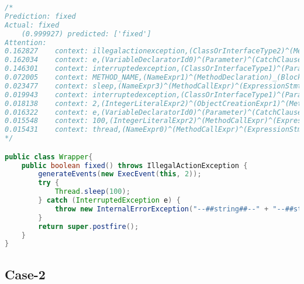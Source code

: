 \begin{lstlisting}[basicstyle=\tiny,caption={Case-1 fixed}, label={},language=Java,breaklines=true,
  postbreak=\mbox{\textcolor{red}{$\hookrightarrow$}\space}]
/*
Prediction:	fixed
Actual:	fixed
	(0.999927) predicted: ['fixed']
Attention:
0.162827	context: illegalactionexception,(ClassOrInterfaceType2)^(MethodDeclaration)_(BlockStmt)_(TryStmt)_(CatchClause)_(BlockStmt)_(ThrowStmt)_(ObjectCreationExpr)_(ClassOrInterfaceType0),internalerrorexception
0.162034	context: e,(VariableDeclaratorId0)^(Parameter)^(CatchClause)_(BlockStmt)_(ThrowStmt)_(ObjectCreationExpr)_(ClassOrInterfaceType0),internalerrorexception
0.146301	context: interruptedexception,(ClassOrInterfaceType1)^(Parameter)^(CatchClause)_(BlockStmt)_(ThrowStmt)_(ObjectCreationExpr)_(ClassOrInterfaceType0),internalerrorexception
0.072005	context: METHOD_NAME,(NameExpr1)^(MethodDeclaration)_(BlockStmt)_(TryStmt)_(CatchClause)_(BlockStmt)_(ThrowStmt)_(ObjectCreationExpr)_(ClassOrInterfaceType0),internalerrorexception
0.023477	context: sleep,(NameExpr3)^(MethodCallExpr)^(ExpressionStmt)^(BlockStmt)^(TryStmt)^(BlockStmt)_(ReturnStmt)_(MethodCallExpr0)_(NameExpr2),postfire
0.019943	context: interruptedexception,(ClassOrInterfaceType1)^(Parameter)^(CatchClause)^(TryStmt)^(BlockStmt)_(ReturnStmt)_(MethodCallExpr0)_(NameExpr2),postfire
0.018138	context: 2,(IntegerLiteralExpr2)^(ObjectCreationExpr1)^(MethodCallExpr)^(ExpressionStmt)^(BlockStmt)_(ReturnStmt)_(MethodCallExpr0)_(NameExpr2),postfire
0.016322	context: e,(VariableDeclaratorId0)^(Parameter)^(CatchClause)^(TryStmt)^(BlockStmt)_(ReturnStmt)_(MethodCallExpr0)_(NameExpr2),postfire
0.015548	context: 100,(IntegerLiteralExpr2)^(MethodCallExpr)^(ExpressionStmt)^(BlockStmt)^(TryStmt)^(BlockStmt)_(ReturnStmt)_(MethodCallExpr0)_(NameExpr2),postfire
0.015431	context: thread,(NameExpr0)^(MethodCallExpr)^(ExpressionStmt)^(BlockStmt)^(TryStmt)^(BlockStmt)_(ReturnStmt)_(MethodCallExpr0)_(NameExpr2),postfire
*/

public class Wrapper{
    public boolean fixed() throws IllegalActionException {
        generateEvents(new ExecEvent(this, 2));
        try {
            Thread.sleep(100);
        } catch (InterruptedException e) {
            throw new InternalErrorException("--##string##--" + "--##string##--");
        }
        return super.postfire();
    }
}
\end{lstlisting}

\subsection{Case-2}

